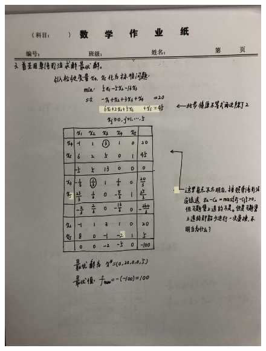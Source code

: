 \documentclass[a4paper]{article}
\begin{document}
\begin{figure}[htbp]
	\centering
	\includegraphics[height=23cm]{4.JPG}
\end{figure}
\end{document}
